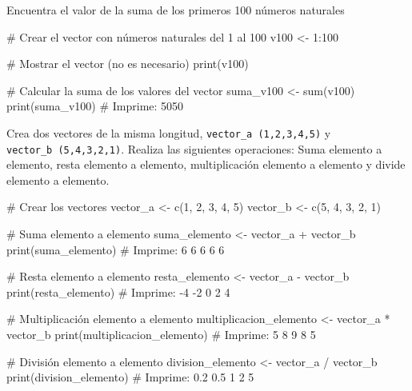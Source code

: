\documentclass[
  letterpaper,
  DIV=11,
  numbers=noendperiod]{scrreprt}
\newenvironment{Shaded}{\begin{snugshade}}{\end{snugshade}}
\newcommand{\CommentTok}[1]{\textcolor[rgb]{0.37,0.37,0.37}{#1}}
\newcommand{\DecValTok}[1]{\textcolor[rgb]{0.68,0.00,0.00}{#1}}
\newcommand{\FunctionTok}[1]{\textcolor[rgb]{0.28,0.35,0.67}{#1}}
\newcommand{\NormalTok}[1]{\textcolor[rgb]{0.00,0.23,0.31}{#1}}
\newcommand{\OtherTok}[1]{\textcolor[rgb]{0.00,0.23,0.31}{#1}}
\newcommand{\SpecialCharTok}[1]{\textcolor[rgb]{0.37,0.37,0.37}{#1}}
\begin{document}
Encuentra el valor de la suma de los primeros 100 números naturales

\begin{Shaded}
\begin{Highlighting}[]
\CommentTok{\# Crear el vector con números naturales del 1 al 100}
\NormalTok{v100 }\OtherTok{\textless{}{-}} \DecValTok{1}\SpecialCharTok{:}\DecValTok{100}

\CommentTok{\# Mostrar el vector (no es necesario)}
\FunctionTok{print}\NormalTok{(v100)}

\CommentTok{\# Calcular la suma de los valores del vector}
\NormalTok{suma\_v100 }\OtherTok{\textless{}{-}} \FunctionTok{sum}\NormalTok{(v100)}
\FunctionTok{print}\NormalTok{(suma\_v100)}
\CommentTok{\# Imprime: 5050}
\end{Highlighting}
\end{Shaded}

Crea dos vectores de la misma longitud, \texttt{vector\_a\ (1,2,3,4,5)}
y \texttt{vector\_b\ (5,4,3,2,1)}. Realiza las siguientes operaciones:
Suma elemento a elemento, resta elemento a elemento, multiplicación
elemento a elemento y divide elemento a elemento.

\begin{Shaded}
\begin{Highlighting}[]
\CommentTok{\# Crear los vectores}
\NormalTok{vector\_a }\OtherTok{\textless{}{-}} \FunctionTok{c}\NormalTok{(}\DecValTok{1}\NormalTok{, }\DecValTok{2}\NormalTok{, }\DecValTok{3}\NormalTok{, }\DecValTok{4}\NormalTok{, }\DecValTok{5}\NormalTok{)}
\NormalTok{vector\_b }\OtherTok{\textless{}{-}} \FunctionTok{c}\NormalTok{(}\DecValTok{5}\NormalTok{, }\DecValTok{4}\NormalTok{, }\DecValTok{3}\NormalTok{, }\DecValTok{2}\NormalTok{, }\DecValTok{1}\NormalTok{)}

\CommentTok{\# Suma elemento a elemento}
\NormalTok{suma\_elemento }\OtherTok{\textless{}{-}}\NormalTok{ vector\_a }\SpecialCharTok{+}\NormalTok{ vector\_b}
\FunctionTok{print}\NormalTok{(suma\_elemento)  }\CommentTok{\# Imprime: 6 6 6 6 6}

\CommentTok{\# Resta elemento a elemento}
\NormalTok{resta\_elemento }\OtherTok{\textless{}{-}}\NormalTok{ vector\_a }\SpecialCharTok{{-}}\NormalTok{ vector\_b}
\FunctionTok{print}\NormalTok{(resta\_elemento)  }\CommentTok{\# Imprime: {-}4 {-}2 0 2 4}

\CommentTok{\# Multiplicación elemento a elemento}
\NormalTok{multiplicacion\_elemento }\OtherTok{\textless{}{-}}\NormalTok{ vector\_a }\SpecialCharTok{*}\NormalTok{ vector\_b}
\FunctionTok{print}\NormalTok{(multiplicacion\_elemento)  }\CommentTok{\# Imprime: 5 8 9 8 5}

\CommentTok{\# División elemento a elemento}
\NormalTok{division\_elemento }\OtherTok{\textless{}{-}}\NormalTok{ vector\_a }\SpecialCharTok{/}\NormalTok{ vector\_b}
\FunctionTok{print}\NormalTok{(division\_elemento)  }\CommentTok{\# Imprime: 0.2 0.5 1 2 5}
\end{Highlighting}
\end{Shaded}
\end{document}
